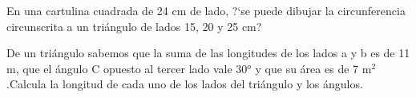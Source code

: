 \vspace{-8mm}
\begin{flushright}
\begin{footnotesize} \textcolor{gris}{}	\end{footnotesize}
\end{flushright}

\begin{mipropuesto}
	
	
En una cartulina cuadrada de 24 cm de lado, ?`se puede dibujar la circunferencia circunscrita a un triángulo de lados 15, 20 y 25 cm?
\end{mipropuesto}

\vspace{-8mm}
\begin{flushright}
\begin{footnotesize} \textcolor{gris}{}	\end{footnotesize}
\end{flushright}

\begin{mipropuesto}
	
	De un triángulo sabemos que la suma de las longitudes de los lados a y b es de 11 m, que el ángulo C opuesto al tercer lado vale 30$^o$ y que su área es de 7 m$^2$.Calcula la longitud de cada uno de los lados del triángulo y  los ángulos.
\end{mipropuesto}

\vspace{-8mm}
\begin{flushright}
\begin{footnotesize} \textcolor{gris}{}	\end{footnotesize}
\end{flushright}

\vspace{-8mm}
\begin{flushright}
\begin{footnotesize} \textcolor{gris}{}	\end{footnotesize}
\end{flushright}



